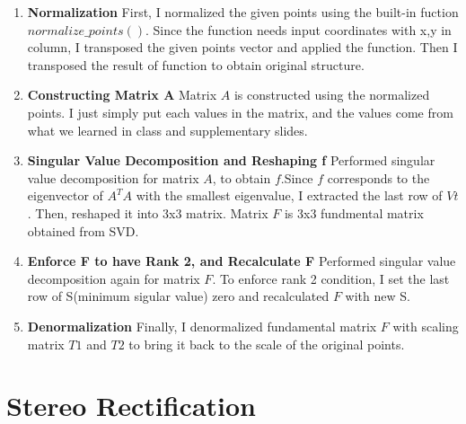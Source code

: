 \begin{enumerate}
    \item \textbf{Normalization}
    First, I normalized the given points using the built-in fuction $normalize\_points()$. Since the function needs input coordinates with x,y in column, I transposed the given points vector and applied the function.
    Then I transposed the result of function to obtain original structure.
    
    \item \textbf{Constructing Matrix A}
    Matrix $A$ is constructed using the normalized points. I just simply put each values in the matrix, and the values come from what we learned in class and supplementary slides.
    
    \item \textbf{Singular Value Decomposition and Reshaping f}
    Performed singular value decomposition for matrix $A$, to obtain $f$.Since $f$ corresponds to the eigenvector of $A^TA$ with the smallest eigenvalue, I extracted the last row of $Vt$. Then, reshaped it into 3x3 matrix. Matrix $F$ is 3x3 fundmental matrix obtained from SVD.
    
    \item \textbf{Enforce F to have Rank 2, and Recalculate F}
    Performed singular value decomposition again for matrix $F$. To enforce rank 2 condition, I set the last row of S(minimum sigular value) zero and recalculated $F$ with new S.
    
    \item \textbf{Denormalization}
    Finally, I denormalized fundamental matrix $F$ with scaling matrix $T1$ and $T2$ to bring it back to the scale of the original points.
\end{enumerate}

\section*{Stereo Rectification}

